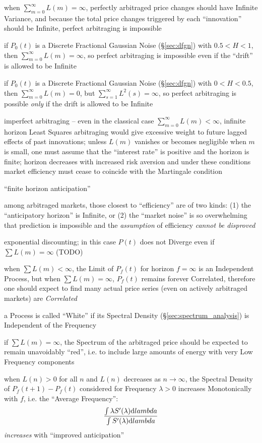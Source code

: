 when $\sum_{m=0}^\infty L(m) = \infty$, perfectly arbitraged price changes
should have Infinite Variance, and because the total price changes triggered by
each ``innovation'' should be Infinite, perfect arbitraging is impossible

if $P_0(t)$ is a Discrete Fractional Gaussian Noise (\S\ref{sec:dfgn}) with
$0.5 < H < 1$, then $\sum_{m=0}^\infty L(m) = \infty$, so perfect arbitraging is
impossible even if the ``drift'' is allowed to be Infinite

if $P_0(t)$ is a Discrete Fractional Gaussian Noise (\S\ref{sec:dfgn}) with
$0 < H < 0.5$, then $\sum_{m=0}^\infty L(m) = 0$, but
$\sum_{s=1}^\infty L^2(s) = \infty$, so perfect arbitraging is possible
\emph{only} if the drift is allowed to be Infinite

imperfect arbitraging -- even in the classical case
$\sum_{m=0}^\infty L(m) < \infty$, infinite horizon Least Squares arbitraging
would give excessive weight to future lagged effects of past innovations; unless
$L(m)$ vanishes or becomes negligible when $m$ is small, one must assume that
the ``interest rate'' is positive and the horizon is finite; horizon decreases
with increased risk aversion and under these conditions market efficiency must
cease to coincide with the Martingale condition

``finite horizon anticipation''

among arbitraged markets, those closest to ``efficiency'' are of two kinds: (1)
the ``anticipatory horizon'' is Infinite, or (2) the ``market noise'' is so
overwhelming that prediction is impossible and the \emph{assumption} of
efficiency \emph{cannot be disproved}

exponential discounting; in this case $P(t)$ does not Diverge even if
$\sum L(m) = \infty$ (TODO)

when $\sum L(m) < \infty$, the Limit of $P_f(t)$ for horizon $f = \infty$ is an
Independent Process, but when $\sum L(m) = \infty$, $P_f(t)$ remains forever
Correlated, therefore one should expect to find many actual price series (even
on actively arbitraged markets) are \emph{Correlated}

a Process is called ``White'' if its Spectral Density
(\S\ref{sec:spectrum_analysis}) is Independent of the Frequency

if $\sum L(m) = \infty$, the Spectrum of the arbitraged price should be expected
to remain unavoidably ``red'', i.e. to include large amounts of energy with very
Low Frequency components

when $L(n) > 0$ for all $n$ and $L(n)$ decreases as $n \to \infty$, the Spectral
Density of $P_f(t+1) - P_f(t)$ considered for Frequency $\lambda > 0$ increases
Monotonically with $f$, i.e. the ``Average Frequency'':
\[
  \frac{\int \lambda S'(\lambda) \mathrm{d}lambda}
    {\int S'(\lambda) \mathrm{d}lambda}
\]
\emph{increases} with ``improved anticipation''

